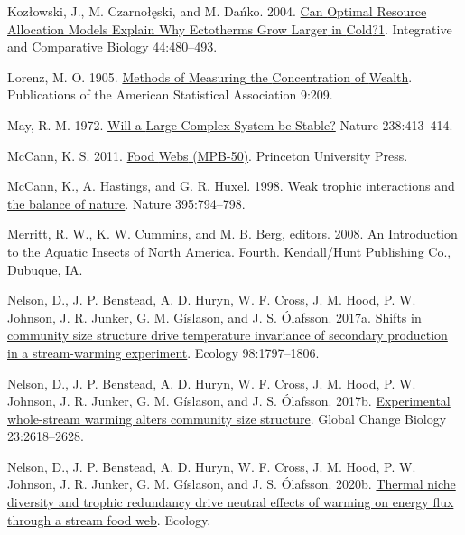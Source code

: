 \documentclass[
]{article}
\newlength{\cslhangindent}
\newlength{\cslentryspacingunit} %
\newenvironment{CSLReferences}[2] %
 {%
  \setlength{\parindent}{0pt}
  \ifodd #1
  \let\oldpar\par
  \def\par{\hangindent=\cslhangindent\oldpar}
  \fi
  \setlength{\parskip}{#2\cslentryspacingunit}
 }%
 {}
\begin{document}
\begin{CSLReferences}{1}{0}
\leavevmode{}%
Kozłowski, J., M. Czarnołęski, and M. Dańko. 2004.
\href{https://doi.org/10.1093/icb/44.6.480}{Can {Optimal Resource
Allocation Models Explain Why Ectotherms Grow Larger} in {Cold}?1}.
Integrative and Comparative Biology 44:480--493.

\leavevmode{}%
Lorenz, M. O. 1905. \href{https://doi.org/10.2307/2276207}{Methods of
{Measuring} the {Concentration} of {Wealth}}. Publications of the
American Statistical Association 9:209.

\leavevmode{}%
May, R. M. 1972. \href{https://doi.org/10.1038/238413a0}{Will a {Large
Complex System} be {Stable}?} Nature 238:413--414.

\leavevmode{}%
McCann, K. S. 2011.
\href{https://doi.org/10.23943/princeton/9780691134178.001.0001}{Food
{Webs} ({MPB-50})}. {Princeton University Press}.

\leavevmode{}%
McCann, K., A. Hastings, and G. R. Huxel. 1998.
\href{https://doi.org/10.1038/27427}{Weak trophic interactions and the
balance of nature}. Nature 395:794--798.

\leavevmode{}%
Merritt, R. W., K. W. Cummins, and M. B. Berg, editors. 2008. An
{Introduction} to the {Aquatic Insects} of {North America}. Fourth.
{Kendall/Hunt Publishing Co.}, {Dubuque, IA}.

\leavevmode{}%
Nelson, D., J. P. Benstead, A. D. Huryn, W. F. Cross, J. M. Hood, P. W.
Johnson, J. R. Junker, G. M. Gíslason, and J. S. Ólafsson. 2017a.
\href{https://doi.org/10.1002/ecy.1857}{Shifts in community size
structure drive temperature invariance of secondary production in a
stream-warming experiment}. Ecology 98:1797--1806.

\leavevmode{}%
Nelson, D., J. P. Benstead, A. D. Huryn, W. F. Cross, J. M. Hood, P. W.
Johnson, J. R. Junker, G. M. Gíslason, and J. S. Ólafsson. 2017b.
\href{https://doi.org/10.1111/gcb.13574}{Experimental whole-stream
warming alters community size structure}. Global Change Biology
23:2618--2628.

\leavevmode{}%
Nelson, D., J. P. Benstead, A. D. Huryn, W. F. Cross, J. M. Hood, P. W.
Johnson, J. R. Junker, G. M. Gíslason, and J. S. Ólafsson. 2020b.
\href{https://doi.org/10.1002/ecy.2952}{Thermal niche diversity and
trophic redundancy drive neutral effects of warming on energy flux
through a stream food web}. Ecology.


\end{CSLReferences}
\end{document}
